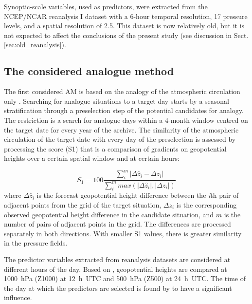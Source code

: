 \documentclass[hess, manuscript]{copernicus}
\begin{document}
	Synoptic-scale variables, used as predictors, were extracted from the NCEP/NCAR reanalysis I dataset \citep{Kalnay1996} with a 6-hour temporal resolution, 17 pressure levels, and a spatial resolution of 2.5\degree. This dataset is now relatively old, but it is not expected to affect the conclusions of the present study (see discussion in Sect. \ref{sec:old_reanalysis}).
	
	
	\subsection{The considered analogue method}
	\label{sec:analog_method}
	
	The first considered AM is based on the analogy of the atmospheric circulation only \citep[Table \ref{table:method_2Z},][]{Obled2002, Bontron2005, Marty2012}. Searching for analogue situations to a target day starts by a seasonal stratification through a preselection step of the potential candidates for analogy. The restriction is a search for analogue days within a 4-month window centred on the target date for every year of the archive. The similarity of the atmospheric circulation of the target date with every day of the preselection is assessed by processing the \citet{Teweles1954} score (S1) that is a comparison of gradients on geopotential heights over a certain spatial window and at certain hours:
	
	\begin{equation}
	\label{eq:S1}
	S_{1}=100 \frac {\displaystyle \sum_{i}^{m} \vert \Delta\hat{z}_{i} - \Delta z_{i} \vert}
	{\displaystyle \sum_{i}^{m} max( \vert \Delta\hat{z}_{i} \vert , \vert \Delta z_{i} \vert ) }
	\end{equation}
	where $\Delta \hat{z}_{i}$ is the forecast geopotential height difference between the \textit{i}th pair of adjacent points from the grid of the target situation, $\Delta z_{i}$ is the corresponding observed geopotential height difference in the candidate situation, and $m$ is the number of pairs of adjacent points in the grid. The differences are processed separately in both directions. With smaller S1 values, there is greater similarity in the pressure fields.
	
	The predictor variables extracted from reanalysis datasets are considered at different hours of the day. Based on \citet{Bontron2005}, geopotential heights are compared at 1000~hPa (Z1000) at 12~h~UTC and 500~hPa (Z500) at 24~h~UTC. The time of the day at which the predictors are selected is found by \citet{Bontron2004} to have a significant influence.
	
\end{document}
